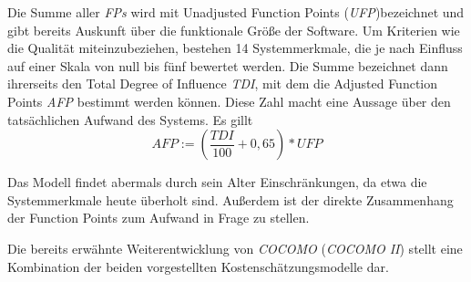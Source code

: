 
Die Summe aller \textit{FPs} wird mit Unadjusted Function Points (\textit{UFP})bezeichnet und gibt bereits Auskunft über die funktionale Größe der Software. Um Kriterien wie die Qualität miteinzubeziehen, bestehen 14 Systemmerkmale, die je nach Einfluss auf einer Skala von null bis fünf bewertet werden. Die Summe bezeichnet dann ihrerseits den Total Degree of Influence \textit{TDI}, mit dem die Adjusted Function Points \textit{AFP} bestimmt werden können. Diese Zahl macht eine Aussage über den tatsächlichen Aufwand des Systems. Es gillt 
$$AFP := \left (\frac{TDI}{100}+0,65 \right ) * UFP$$

Das Modell findet abermals durch sein Alter Einschränkungen, da etwa die Systemmerkmale heute überholt sind. Außerdem ist der direkte Zusammenhang der Function Points zum Aufwand in Frage zu stellen.

Die bereits erwähnte Weiterentwicklung von \textit{COCOMO} (\textit{COCOMO II}) stellt eine Kombination der beiden vorgestellten Kostenschätzungsmodelle dar.